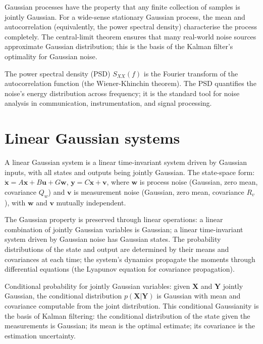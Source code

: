 Gaussian processes have the property that any finite collection of samples is jointly Gaussian. For a wide-sense stationary Gaussian process, the mean and autocorrelation (equivalently, the power spectral density) characterise the process completely. The central-limit theorem ensures that many real-world noise sources approximate Gaussian distribution; this is the basis of the Kalman filter's optimality for Gaussian noise.

The power spectral density (PSD) $S_{XX}(f)$ is the Fourier transform of the autocorrelation function (the Wiener-Khinchin theorem). The PSD quantifies the noise's energy distribution across frequency; it is the standard tool for noise analysis in communication, instrumentation, and signal processing.

\section{Linear Gaussian systems}

A linear Gaussian system is a linear time-invariant system driven by Gaussian inputs, with all states and outputs being jointly Gaussian. The state-space form: $\dot{\mathbf{x}} = A\mathbf{x} + B\mathbf{u} + G\mathbf{w}$, $\mathbf{y} = C\mathbf{x} + \mathbf{v}$, where $\mathbf{w}$ is process noise (Gaussian, zero mean, covariance $Q_w$) and $\mathbf{v}$ is measurement noise (Gaussian, zero mean, covariance $R_v$), with $\mathbf{w}$ and $\mathbf{v}$ mutually independent.

The Gaussian property is preserved through linear operations: a linear combination of jointly Gaussian variables is Gaussian; a linear time-invariant system driven by Gaussian noise has Gaussian states. The probability distributions of the state and output are determined by their means and covariances at each time; the system's dynamics propagate the moments through differential equations (the Lyapunov equation for covariance propagation).

Conditional probability for jointly Gaussian variables: given $\mathbf{X}$ and $\mathbf{Y}$ jointly Gaussian, the conditional distribution $p(\mathbf{X} | \mathbf{Y})$ is Gaussian with mean and covariance computable from the joint distribution. This conditional Gaussianity is the basis of Kalman filtering: the conditional distribution of the state given the measurements is Gaussian; its mean is the optimal estimate; its covariance is the estimation uncertainty.

